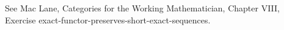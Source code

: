 See Mac Lane, Categories for the Working Mathematician, Chapter VIII, Exercise exact-functor-preserves-short-exact-sequences.
